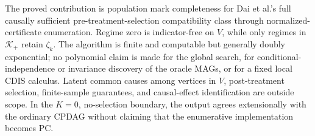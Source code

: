 The proved contribution is population mark completeness for Dai et al.'s full causally sufficient pre-treatment-selection compatibility class through normalized-certificate enumeration.  Regime zero is indicator-free on \(V\), while only regimes in \(\mathcal K_+\) retain \(\zeta_k\).  The algorithm is finite and computable but generally doubly exponential; no polynomial claim is made for the global search, for conditional-independence or invariance discovery of the oracle MAGs, or for a fixed local CDIS calculus.  Latent common causes among vertices in \(V\), post-treatment selection, finite-sample guarantees, and causal-effect identification are outside scope.  In the \(K=0\), no-selection boundary, the output agrees extensionally with the ordinary CPDAG without claiming that the enumerative implementation becomes PC.